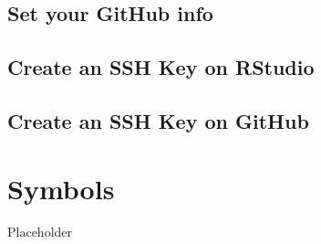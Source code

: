 \documentclass[
]{book}
\begin{document}
\hypertarget{github-info}{%
\section{Set your GitHub info}\label{github-info}}

\hypertarget{create-an-ssh-key-on-rstudio}{%
\section{Create an SSH Key on RStudio}\label{create-an-ssh-key-on-rstudio}}

\hypertarget{create-an-ssh-key-on-github}{%
\section{Create an SSH Key on GitHub}\label{create-an-ssh-key-on-github}}

\hypertarget{symbols}{%
\chapter{Symbols}\label{symbols}}

Placeholder

  
\end{document}
